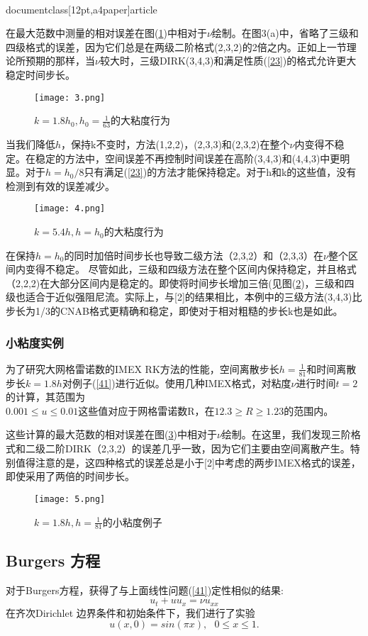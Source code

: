 \\documentclass[12pt,a4paper]{article}
\begin{document}
在最大范数中测量的相对误差在图(\ref{figures3})中相对于$\nu$绘制。在图3(a)中，省略了三级和四级格式的误差，因为它们总是在两级二阶格式(2,3,2)的2倍之内。正如上一节理论所预期的那样，当$\nu$较大时，三级DIRK(3,4,3)和满足性质(\ref{23})的格式允许更大稳定时间步长。
\begin{figure}[H]
\texttt{[image: 3.png]}
\caption{$k=1.8h_{0},h_{0}=\frac{1}{63}$的大粘度行为}
\centering
\label{figures3}
\end{figure}

当我们降低$h$，保持k不变时，方法(1,2,2)，(2,3,3)和(2,3,2)在整个$\nu $内变得不稳定。在稳定的方法中，空间误差不再控制时间误差在高阶(3,4,3)和(4,4,3)中更明显。对于$h=h_{0}/8$只有满足(\ref{23})的方法才能保持稳定。对于h和k的这些值，没有检测到有效的误差减少。
\begin{figure}[H]
\texttt{[image: 4.png]}
\caption{$k=5.4h,h=h_{0}$的大粘度行为}
\centering
\label{figures4}
\end{figure}

在保持$h=h_{0}$的同时加倍时间步长也导致二级方法（2,3,2）和（2,3,3）在$\nu$整个区间内变得不稳定。 尽管如此，三级和四级方法在整个区间内保持稳定，并且格式（2,2,2)在大部分区间内是稳定的。即使将时间步长增加三倍(见图(\ref{figures4})，三级和四级也适合于近似强阻尼流。实际上，与[2]的结果相比，本例中的三级方法(3,4,3)比步长为1/3的CNAB格式更精确和稳定，即使对于相对粗糙的步长k也是如此。

\subsubsection{小粘度实例}

为了研究大网格雷诺数的IMEX RK方法的性能，空间离散步长$h=\frac{1}{81}$和时间离散步长$k=1.8h$对例子(\ref{41})进行近似。使用几种IMEX格式，对粘度$\nu $进行时间$t = 2$的计算，其范围为\\$0.001\le u\le 0.01$这些值对应于网格雷诺数R，在$12.3\ge R \ge 1.23$的范围内。

这些计算的最大范数的相对误差在图(\ref{figures5})中相对于$\nu$绘制。在这里，我们发现三阶格式和二级二阶DIRK（2,3,2）的误差几乎一致，因为它们主要由空间离散产生。特别值得注意的是，这四种格式的误差总是小于[2]中考虑的两步IMEX格式的误差，即使采用了两倍的时间步长。

\begin{figure}[H]
\texttt{[image: 5.png]}
\caption{$k=1.8h,h=\frac{1}{81}$的小粘度例子}
\centering
\label{figures5}
\end{figure}

\subsection{Burgers 方程}
对于Burgers方程，获得了与上面线性问题(\ref{41})定性相似的结果:
\begin{equation}
u_{t}+uu_{x}=\nu u_{xx}
\end{equation}
在齐次Dirichlet 边界条件和初始条件下，我们进行了实验
\begin{equation*}
u(x,0)=sin(\pi x),~~~0\le x\le 1.
\end{equation*}
\end{document}
